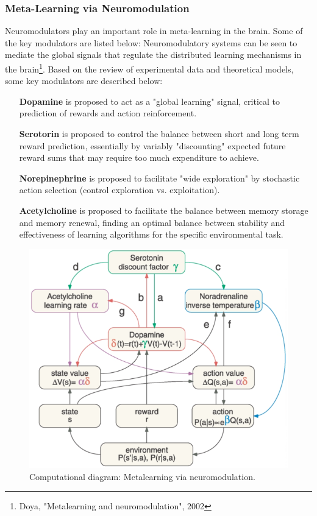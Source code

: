 \documentclass[main]{subfiles}
\begin{document}
\subsubsection{Meta-Learning via Neuromodulation}
Neuromodulators play an important role in meta-learning in the brain. Some of the key modulators are listed below:
Neuromodulatory systems can be seen to mediate the global signals that regulate the distributed learning mechanisms in the brain\footnote{Doya, "Metalearning and neuromodulation", 2002}. Based on the review of experimental data and theoretical models, some key modulators are described below:
\begin{itemize}
    \item[\textbf{Dopamine}] is proposed to act as a "global learning" signal, critical to prediction of rewards and action reinforcement.
    
    \item[\textbf{Serotorin}] is proposed to control the balance between short and long term reward prediction, essentially by variably "discounting" expected future reward sums that may require too much expenditure to achieve.
    
    \item[\textbf{Norepinephrine}] is proposed to facilitate "wide exploration" by stochastic action selection (control exploration vs. exploitation).
    
    \item[\textbf{Acetylcholine}] is proposed to facilitate the balance between memory storage and memory renewal, finding an optimal balance between stability and effectiveness of learning algorithms for the specific environmental task.
\end{itemize}
\begin{figure}[H]
    \centering
    \includegraphics[width=0.8\linewidth]{14_ContinualMetaAndTransferLearning/figures/neuromodulation.png}
    \caption{Computational diagram: Metalearning via neuromodulation.}
    \label{fig:my_label}
\end{figure}
\end{document}
